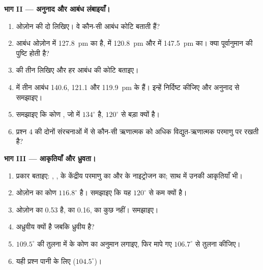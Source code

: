 \begin{problem}
\medskip
\noindent\textbf{भाग II --- अनुनाद और आबंध लंबाइयाँ।}
\begin{enumerate}[resume]
  \item ओज़ोन की दो  लिखिए। वे कौन-सी आबंध कोटि
        बताती हैं?
  \item {} आबंध ओज़ोन में \qty{127.8}{pm} का है,
         में \qty{120.8}{pm} और  में \qty{147.5}{pm} का। क्या
        पूर्वानुमान की पुष्टि होती है?
  \item {} की तीन  लिखिए और हर  आबंध की
        कोटि बताइए।
  \item {} में तीन  आबंध 140.6, 121.1 और
        \qty{119.9}{pm} के हैं। इन्हें निर्दिष्ट कीजिए और अनुनाद से समझाइए।
  \item समझाइए कि कोण , जो  में $134^\circ$ है,
        $120^\circ$ से बड़ा क्यों है।
  \item प्रश्न 4 की दोनों संरचनाओं में से कौन-सी ऋणात्मक
         को अधिक विद्युत-ऋणात्मक परमाणु पर रखती है?
\end{enumerate}

\medskip
\noindent\textbf{भाग III --- आकृतियाँ और ध्रुवता।}
\begin{enumerate}[resume]
  \item प्रकार  बताइए: ,
        ,  के केंद्रीय परमाणु का और  के नाइट्रोजन का;
        साथ में उनकी आकृतियाँ भी।
  \item ओज़ोन का कोण $116.8^\circ$ है। समझाइए कि यह
        $120^\circ$ से कम क्यों है।
  \item ओज़ोन का  \qty{0.53}{\debye} है,  का
        \qty{0.16}{\debye},  का कुछ नहीं। समझाइए।
  \item {} अध्रुवीय क्यों है जबकि  ध्रुवीय है?
  \item $109.5^\circ$ की तुलना में  के कोण का अनुमान लगाइए, फिर
        मापे गए $106.7^\circ$ से तुलना कीजिए।
  \item यही प्रश्न पानी के लिए ($104.5^\circ$)।
\end{enumerate}


\end{problem}
